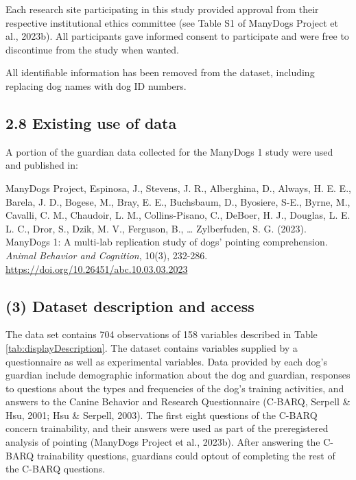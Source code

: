 \documentclass[
  man,floatsintext]{apa6}
\begin{document}
Each research site participating in this study provided approval from their respective institutional ethics committee (see Table S1 of ManyDogs Project et al., 2023b). All participants gave informed consent to participate and were free to discontinue from the study when wanted.

All identifiable information has been removed from the dataset, including replacing dog names with dog ID numbers.

\hypertarget{existing-use-of-data}{%
\subsection{2.8 Existing use of data}\label{existing-use-of-data}}

A portion of the guardian data collected for the ManyDogs 1 study were used and published in:

ManyDogs Project, Espinosa, J., Stevens, J. R., Alberghina, D., Always, H. E. E., Barela, J. D., Bogese, M., Bray, E. E., Buchsbaum, D., Byosiere, S-E., Byrne, M., Cavalli, C. M., Chaudoir, L. M., Collins-Pisano, C., DeBoer, H. J., Douglas, L. E. L. C., Dror, S., Dzik, M. V., Ferguson, B., \ldots{} Zylberfuden, S. G. (2023). ManyDogs 1: A multi-lab replication study of dogs' pointing comprehension. \emph{Animal Behavior and Cognition}, 10(3), 232-286.
\url{https://doi.org/10.26451/abc.10.03.03.2023}

\hypertarget{dataset-description-and-access}{%
\subsection{(3) Dataset description and access}\label{dataset-description-and-access}}

The data set contains 704 observations of 158 variables described in Table \ref{tab:displayDescription}. The dataset contains variables supplied by a questionnaire as well as experimental variables. Data provided by each dog's guardian include demographic information about the dog and guardian, responses to questions about the types and frequencies of the dog's training activities, and answers to the Canine Behavior and Research Questionnaire (C-BARQ, Serpell \& Hsu, 2001; Hsu \& Serpell, 2003). The first eight questions of the C-BARQ concern trainability, and their answers were used as part of the preregistered analysis of pointing (ManyDogs Project et al., 2023b). After answering the C-BARQ trainability questions, guardians could optout of completing the rest of the C-BARQ questions.
\end{document}
